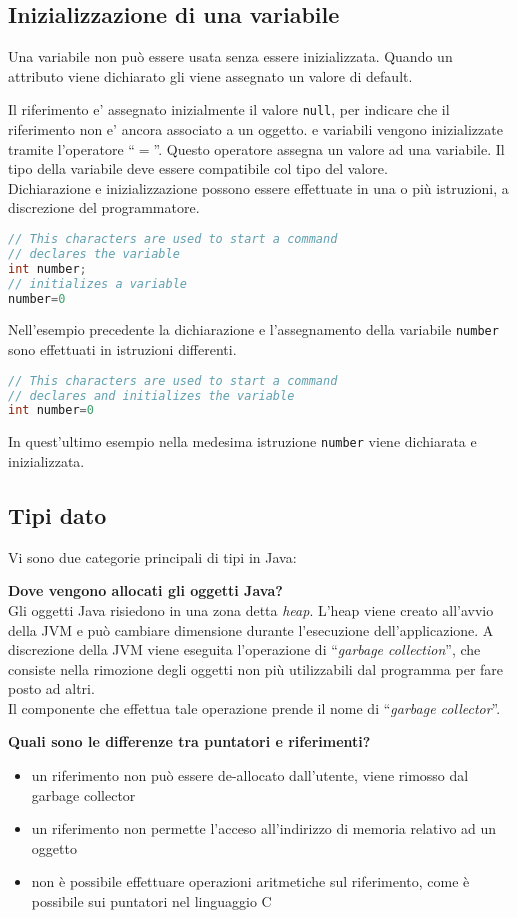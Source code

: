 \documentclass{article}
\begin{document}
\subsection{Inizializzazione di una variabile}
Una variabile non può essere usata senza essere inizializzata. Quando un attributo viene dichiarato gli viene assegnato un valore di default.

Il riferimento e' assegnato inizialmente il valore \texttt{null}, per indicare che il riferimento non e' ancora associato a un oggetto.
e variabili vengono inizializzate tramite l'operatore ``$=$''. Questo operatore assegna un valore ad una variabile.
Il tipo della variabile deve essere compatibile col tipo del valore.\\
Dichiarazione e inizializzazione possono essere effettuate in una o  più istruzioni, a discrezione
del programmatore.
\begin{lstlisting}[language=Java,escapechar=|]
// This characters are used to start a command
// declares the variable
int number;
// initializes a variable
number=0
\end{lstlisting}
Nell'esempio precedente la dichiarazione e l'assegnamento della variabile \texttt{number} sono
effettuati in istruzioni differenti.
\begin{lstlisting}[language=Java,escapechar=|]
// This characters are used to start a command
// declares and initializes the variable
int number=0
\end{lstlisting}
In quest'ultimo esempio nella medesima istruzione \texttt{number} viene dichiarata e inizializzata.


\subsection{Tipi dato}
Vi sono due categorie principali di tipi in Java:



\textbf{Dove vengono allocati gli oggetti Java?}\\
Gli oggetti Java risiedono in una zona detta \emph{heap}. L'heap viene creato all'avvio della JVM e può cambiare dimensione durante l'esecuzione 
dell'applicazione. A discrezione della JVM viene eseguita l'operazione di ``\emph{garbage collection}'', che consiste nella rimozione degli oggetti non più utilizzabili dal programma per fare posto ad altri.\\
Il componente che effettua tale operazione prende il nome di ``\emph{garbage collector}''.


\textbf{Quali sono le differenze tra puntatori e riferimenti?}
\begin{itemize}
\item un riferimento non può essere de-allocato dall'utente, viene rimosso dal garbage collector
\item un riferimento non permette l'acceso all'indirizzo di memoria relativo ad un oggetto%
\item non è possibile effettuare operazioni aritmetiche sul riferimento, come è possibile sui puntatori nel linguaggio C
\end{itemize}
\end{document}
